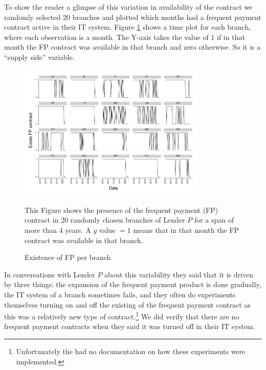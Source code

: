 \documentclass[oneside,11pt]{article}
\begin{document}
To show the reader a glimpse of this variation in availability of the contract we randomly selected 20 branches and plotted which months had a frequent payment contract active in their IT system. Figure \ref{variation_pf_suc} shows a time plot for each branch, where each observation is a month. The Y-axis takes the value of 1 if in that month the FP contract was available in that branch and zero otherwise. So it is a ``supply side'' variable. 

\vspace{.1in}
\begin{figure}[H]
        \caption{Existence of FP per branch}
    \label{variation_pf_suc}
    \begin{center}
        \centering
        \includegraphics[width=0.80\textwidth]{Figuras/active_pf_suc.pdf}
    \end{center}
     \scriptsize This Figure shows the presence of the frequent payment (FP) contract in 20 randomly chosen branches of Lender $P$ for a span of more than 4 years. A $y$ value $=1$ means that in that month the FP contract was available in that branch. 
\end{figure}
\vspace{.1in}

In conversations with Lender $P$ about this variability they said that it is driven by three things: the expansion of the frequent payment product is done gradually, the IT system of a branch sometimes fails, and they often do experiments themselves turning on and off the existing of the frequent payment contract as this was a relatively new type of contract.\footnote{Unfortunately the had no documentation on how these experiments were implemented.} We did verify that there are no frequent payment contracts when they said it was turned off in their IT system.
\end{document}
